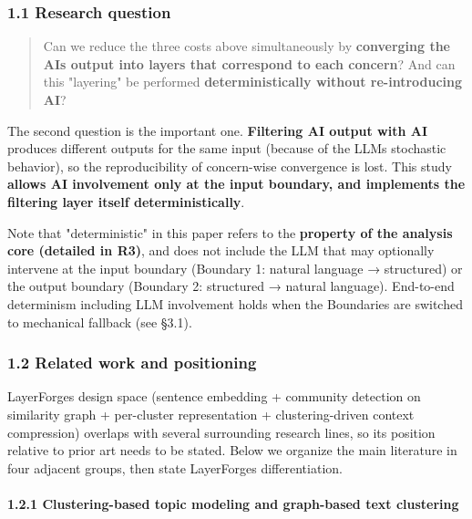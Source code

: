\documentclass[
]{article}
\begin{document}
\subsubsection{1.1 Research question}\label{11-research-question}

\begin{quote}
Can we reduce the three costs above simultaneously by \textbf{converging
the AI\textquotesingle s output into layers that correspond to each
concern}? And can this "layering" be performed \textbf{deterministically
without re-introducing AI}?
\end{quote}

The second question is the important one. \textbf{Filtering AI output
with AI} produces different outputs for the same input (because of the
LLM\textquotesingle s stochastic behavior), so the reproducibility of
concern-wise convergence is lost. This study \textbf{allows AI
involvement only at the input boundary, and implements the filtering
layer itself deterministically}.

Note that "deterministic" in this paper refers to the \textbf{property
of the analysis core (detailed in R3)}, and does not include the LLM
that may optionally intervene at the input boundary (Boundary 1: natural
language → structured) or the output boundary (Boundary 2: structured →
natural language). End-to-end determinism including LLM involvement
holds when the Boundaries are switched to mechanical fallback (see
§3.1).

\subsubsection{1.2 Related work and
positioning}\label{12-related-work-and-positioning}

LayerForge\textquotesingle s design space (sentence embedding +
community detection on similarity graph + per-cluster representation +
clustering-driven context compression) overlaps with several surrounding
research lines, so its position relative to prior art needs to be
stated. Below we organize the main literature in four adjacent groups,
then state LayerForge\textquotesingle s differentiation.

\paragraph{1.2.1 Clustering-based topic modeling and graph-based text
clustering}\label{121-clustering-based-topic-modeling-and-graph-based-text-clustering}
\end{document}
